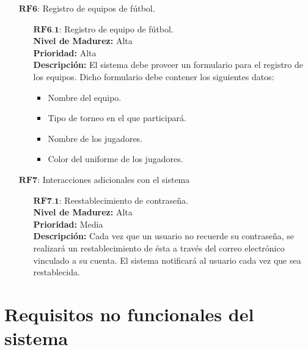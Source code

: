 \begin{enumerate}
\begin{enumerate}
		\end{enumerate}
		\item[$\textbf{RF6:}$] Registro de equipos de fútbol.
		\begin{enumerate}
			\item[$\textbf{RF6.1:}$] Registro de equipo de fútbol. \\
				\tab \textbf{Nivel de Madurez:} Alta \\
				\tab \textbf{Prioridad:} Alta  \\
				\tab \textbf{Descripción:} El sistema debe proveer un formulario para el registro de los equipos. Dicho formulario debe contener los siguientes datos: \\
				\begin{itemize}
					\item Nombre del equipo.
					\item Tipo de torneo en el que participará.
					\item Nombre de los jugadores.
					\item Color del uniforme de los jugadores.
				\end{itemize} 
		\end{enumerate}
	\item[$\textbf{RF7:}$] Interacciones adicionales con el sistema
		\begin{enumerate}
			\item[$\textbf{RF7.1:}$] Reestablecimiento de contraseña.\\
				\tab \textbf{Nivel de Madurez:} Alta \\
				\tab \textbf{Prioridad:} Media  \\
				\tab \textbf{Descripción:} Cada vez que un usuario no recuerde su contraseña, se realizará un restablecimiento de ésta a través del correo electrónico vinculado a su cuenta. El sistema notificará al usuario cada vez que sea restablecida. \\
		\end{enumerate}
		
\end{enumerate}
\newpage
\section{Requisitos no funcionales del sistema}

